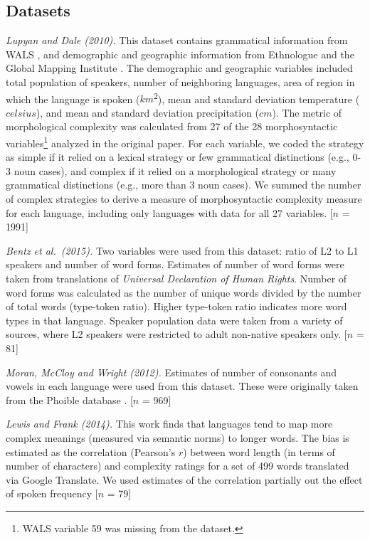 \documentclass[10pt,letterpaper]{article}
\begin{document}
\subsection{Datasets}
{\it Lupyan and Dale (2010).} This dataset contains grammatical information from WALS \cite{wals}, and demographic and geographic information from Ethnologue and the Global Mapping Institute \cite{gordon2005,gmi}. The demographic and geographic variables included total population of speakers, number of neighboring languages, area of region in which the language is spoken ($km$\textsuperscript{2}), mean and standard deviation temperature ($celsius$), and mean and standard deviation precipitation ($cm$). The metric of morphological complexity was calculated from  27 of the 28 morphosyntactic variables\footnote{WALS variable 59 was missing from the dataset.} analyzed in the original paper. For each variable, we coded the strategy as simple if it relied on a lexical strategy or few grammatical distinctions (e.g.,  0-3 noun cases), and complex if it relied on a morphological strategy or many grammatical distinctions (e.g.,  more than 3 noun cases). We summed the number of complex strategies to derive a measure of morphosyntactic complexity measure for each language, including only languages with data for all 27 variables. [$n$ = 1991] 

{\it Bentz et al.\ (2015).} Two variables were used from this dataset: ratio of L2 to L1 speakers and number of word forms. Estimates of number of word forms were taken from translations of  {\it Universal Declaration of Human Rights}. Number of word forms was calculated as the number of unique words divided by the number of total words (type-token ratio). Higher type-token ratio indicates more word types in that language. Speaker population data were taken from a variety of sources, where L2 speakers were restricted to adult non-native speakers only. [$n$ = 81]

{\it Moran, McCloy and Wright (2012).} Estimates of number of consonants and vowels in each language were used from this dataset. These were originally taken from the Phoible database \cite{phoible}. [$n$ = 969]

{\it Lewis and Frank (2014).} This work finds that languages tend to map more complex meanings (measured via semantic norms) to longer words. The bias is estimated as the correlation (Pearson's $r$) between word length (in terms of number of characters) and complexity ratings for a set of 499 words translated via Google Translate. We used estimates of the correlation partially out the effect of spoken frequency [$n$ = 79]
\end{document}
